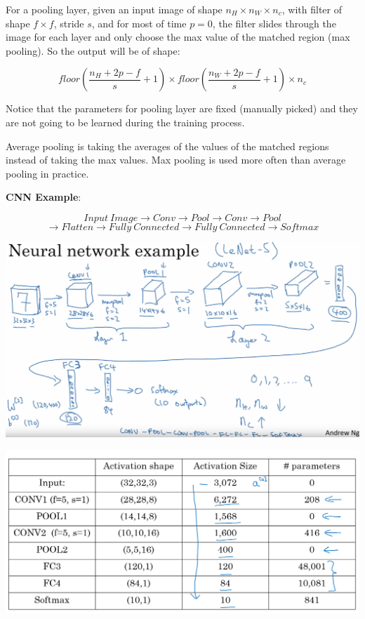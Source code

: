 \documentclass{article}
\begin{document}
\noindent For a pooling layer, given an input image of shape \(n_{H} \times n_{W} \times n_{c}\), with filter of shape \(f \times f\), stride \(s\), and for most of time \(p = 0\), the filter slides through the image for each layer and only choose the max value of the matched region (max pooling). So the output will be of shape:

\[floor(\frac{n_{H} + 2p - f}{s}  + 1) \times floor(\frac{n_{W} + 2p - f}{s} + 1) \times n_{c}\]

\noindent Notice that the parameters for pooling layer are fixed (manually picked) and they are not going to be learned during the training process.

\bigskip

\noindent Average pooling is taking the averages of the values of the matched regions instead of taking the max values. Max pooling is used more often than average pooling in practice.

\bigskip

\noindent \textbf{CNN Example}:

\[Input \ Image \longrightarrow Conv \longrightarrow Pool \longrightarrow Conv \longrightarrow Pool\]
\[\longrightarrow Flatten \longrightarrow Fully \ Connected \longrightarrow Fully \ Connected \longrightarrow Softmax\]

\begin{center}
\includegraphics[scale=0.2]{./images/cnn_example.png}
\end{center}
\begin{center}
\includegraphics[scale=0.3]{./images/cnn_example_table.png}
\end{center}
\end{document}

